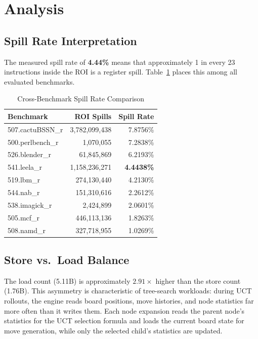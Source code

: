 \documentclass[conference]{IEEEtran}
\begin{document}
\section{Analysis}

\subsection{Spill Rate Interpretation}

The measured spill rate of \textbf{4.44\%} means that approximately
1 in every 23 instructions inside the ROI is a register spill.
Table~\ref{tab:compare} places this among all evaluated benchmarks.

\begin{table}[H]
\centering
\caption{Cross-Benchmark Spill Rate Comparison}
\label{tab:compare}
\begin{tabular}{lrr}
\toprule
\textbf{Benchmark} & \textbf{ROI Spills} & \textbf{Spill Rate} \\
\midrule
507.cactuBSSN\_r & 3,782,099,438 & 7.8756\% \\
500.perlbench\_r &     1,070,055 & 7.2838\% \\
526.blender\_r   &    61,845,869 & 6.2193\% \\
541.leela\_r     & 1,158,236,271 & \textbf{4.4438\%} \\
519.lbm\_r       &   274,130,440 & 4.2130\% \\
544.nab\_r       &   151,310,616 & 2.2612\% \\
538.imagick\_r   &     2,424,899 & 2.0601\% \\
505.mcf\_r       &   446,113,136 & 1.8263\% \\
508.namd\_r      &   327,718,955 & 1.0269\% \\
\bottomrule
\end{tabular}
\end{table}

\subsection{Store vs.\ Load Balance}

The load count (5.11B) is approximately $2.91\times$ higher than the
store count (1.76B). This asymmetry is characteristic of tree-search
workloads: during UCT rollouts, the engine reads board positions,
move histories, and node statistics far more often than it writes them.
Each node expansion reads the parent node's statistics for the UCT
selection formula and loads the current board state for move generation,
while only the selected child's statistics are updated.
\end{document}
